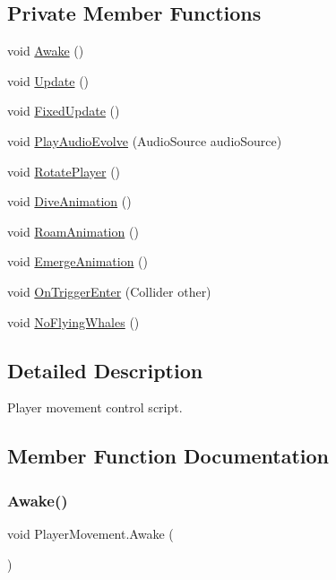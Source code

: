 \subsection*{Private Member Functions}
\begin{DoxyCompactItemize}
\item 
void \hyperlink{class_player_movement_a589e2f9da48918ca04fea0c418f46d32}{Awake} ()
\item 
void \hyperlink{class_player_movement_aaf9b77d7177d538be9c1447d08191322}{Update} ()
\item 
void \hyperlink{class_player_movement_a0caaa871b9ef680c9f02bd0e22c77db1}{Fixed\+Update} ()
\item 
void \hyperlink{class_player_movement_afec8bf4f997d2c43559fe0069870bcb1}{Play\+Audio\+Evolve} (Audio\+Source audio\+Source)
\item 
void \hyperlink{class_player_movement_af5abbfc3a23ae53153afb7fc46588770}{Rotate\+Player} ()
\item 
void \hyperlink{class_player_movement_a7e49eea241ab7a3b11125c33aae4b12d}{Dive\+Animation} ()
\item 
void \hyperlink{class_player_movement_a96683270dabdb0389c014c436aaf3cb6}{Roam\+Animation} ()
\item 
void \hyperlink{class_player_movement_ae0190d96bfed446e24e623ef87a7788a}{Emerge\+Animation} ()
\item 
void \hyperlink{class_player_movement_a0d2a1162c4cc3a5d4be939d00368c6e3}{On\+Trigger\+Enter} (Collider other)
\item 
void \hyperlink{class_player_movement_a49aa6a80bb76113ff3702536ea1b46de}{No\+Flying\+Whales} ()
\end{DoxyCompactItemize}


\subsection{Detailed Description}
Player movement control script. 



\subsection{Member Function Documentation}
\mbox{\label{class_player_movement_a589e2f9da48918ca04fea0c418f46d32}} 
\subsubsection{\texorpdfstring{Awake()}{Awake()}}
{\footnotesize\ttfamily void Player\+Movement.\+Awake (\begin{DoxyParamCaption}{ }\end{DoxyParamCaption})\hspace{0.3cm}{\ttfamily [private]}}



